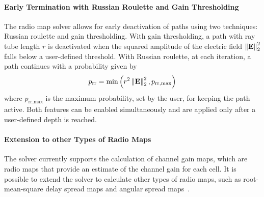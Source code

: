 \paragraph{Early Termination with Russian Roulette and Gain Thresholding}
The radio map solver allows for early deactivation of paths using two techniques: Russian roulette and gain thresholding.
With gain thresholding, a path with ray tube length $r$ is deactivated when the squared amplitude of the electric field $\left\lVert\mathbf{E}\right\rVert_2^2$ falls below a user-defined threshold.
With Russian roulette, at each iteration, a path continues with a probability given by
\begin{equation}
    \label{eq:radio-map-solver-rr-prob}
    p_{\text{rr}} = \min\left( r^2 \left\lVert\mathbf{E}\right\rVert_2^2, p_{\text{rr,max}} \right)
\end{equation}
where $p_{\text{rr,max}}$ is the maximum probability, set by the user, for keeping the path active.
Both features can be enabled simultaneously and are applied only after a user-defined depth is reached.

\paragraph{Extension to other Types of Radio Maps}
The \SRT{} solver currently supports the calculation of channel gain maps, which are radio maps that provide an estimate of the channel gain for each cell. It is possible to extend the solver to calculate other types of radio maps, such as root-mean-square delay spread maps and angular spread maps~\cite{instant_rm}.
